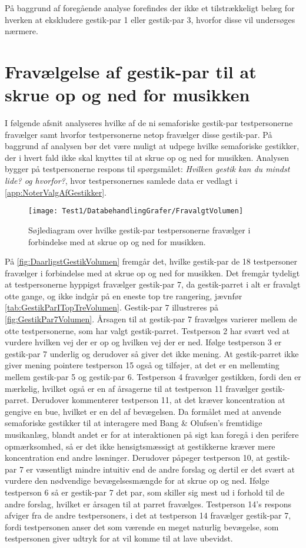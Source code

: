 På baggrund af foregående analyse forefindes der ikke et tilstrækkeligt belæg for hverken at ekskludere gestik-par 1 eller gestik-par 3, hvorfor disse vil undersøges nærmere. 
%
\section{Fravælgelse af gestik-par til at skrue op og ned for musikken}
\label{app:TestresultaterVolumenDaarlig}
%
I følgende afsnit analyseres hvilke af de ni semaforiske gestik-par testpersonerne fravælger samt hvorfor testpersonerne netop fravælger disse gestik-par. På baggrund af analysen bør det være muligt at udpege hvilke semaforiske gestikker, der i hvert fald ikke skal knyttes til at skrue op og ned for musikken. Analysen bygger på testpersonerne respons til spørgsmålet: \textit{Hvilken gestik kan du mindst lide? og hvorfor?}, hvor testpersonernes samlede data er vedlagt i \autoref{app:NoterValgAfGestikker}.
%
\begin{figure}[H]
	\centering
	\texttt{[image: Test1/DatabehandlingGrafer/FravalgtVolumen]}
	\caption{Søjlediagram over hvilke gestik-par testpersonerne fravælger i forbindelse med at skrue op og ned for musikken.}
	\label{fig:DaarligstGestikVolumen}
\end{figure}
\noindent
%
På \autoref{fig:DaarligstGestikVolumen} fremgår det, hvilke gestik-par de 18 testpersoner fravælger i forbindelse med at skrue op og ned for musikken. Det fremgår tydeligt at testpersonerne hyppigst fravælger gestik-par 7, da gestik-parret i alt er fravalgt otte gange, og ikke indgår på en eneste top tre rangering, jævnfør \autoref{tab:GestikParITopTreVolumen}. Gestik-par 7 illustreres på \autoref{fig:GestikPar7Volumen}. Årsagen til at gestik-par 7 fravælges varierer mellem de otte testpersonerne, som har valgt gestik-parret. Testperson 2 har svært ved at vurdere hvilken vej der er op og hvilken vej der er ned. Ifølge testperson 3 er gestik-par 7 underlig og derudover så giver det ikke mening. At gestik-parret ikke giver mening pointere testperson 15 også og tilføjer, at det er en mellemting mellem gestik-par 5 og gestik-par 6. Testperson 4 fravælger gestikken, fordi den er mærkelig, hvilket også er en af årsagerne til at testperson 11 fravælger gestik-parret. Derudover kommenterer testperson 11, at det kræver koncentration at gengive en bue, hvilket er en del af bevægelsen. Da formålet med at anvende semaforiske gestikker til at interagere med Bang $\&$ Olufsen's fremtidige musikanlæg, blandt andet er for at interaktionen på sigt kan foregå i den perifere opmærksomhed, så er det ikke hensigtsmæssigt at gestikkerne kræver mere koncentration end andre løsninger. Derudover påpeger testperson 10, at gestik-par 7 er væsentligt mindre intuitiv end de andre forslag og dertil er det svært at vurdere den nødvendige bevægelsesmængde for at skrue op og ned. Ifølge testperson 6 så er gestik-par 7 det par, som skiller sig mest ud i forhold til de andre forslag, hvilket er årsagen til at parret fravælges. Testperson 14's respons afviger fra de andre testpersoners, i det at testperson 14 fravælger gestik-par 7, fordi testpersonen anser det som værende en meget naturlig bevægelse, som testpersonen giver udtryk for at vil komme til at lave ubevidst.
